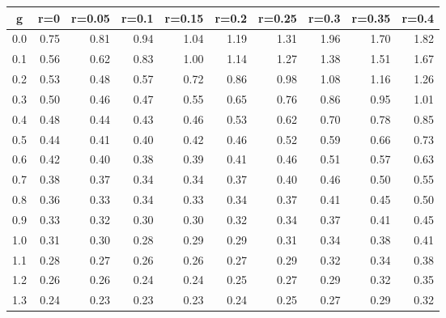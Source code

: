%
\begin{table}[!tbp]
 \begin{center}
 \begin{tabular}{rrrrrrrrrr}\hline\hline
\multicolumn{1}{c}{g}&\multicolumn{1}{c}{r=0}&\multicolumn{1}{c}{r=0.05}&\multicolumn{1}{c}{r=0.1}&\multicolumn{1}{c}{r=0.15}&\multicolumn{1}{c}{r=0.2}&\multicolumn{1}{c}{r=0.25}&\multicolumn{1}{c}{r=0.3}&\multicolumn{1}{c}{r=0.35}&\multicolumn{1}{c}{r=0.4}\tabularnewline
\hline
0.0&0.75&0.81&0.94&1.04&1.19&1.31&1.96&1.70&1.82\tabularnewline
0.1&0.56&0.62&0.83&1.00&1.14&1.27&1.38&1.51&1.67\tabularnewline
0.2&0.53&0.48&0.57&0.72&0.86&0.98&1.08&1.16&1.26\tabularnewline
0.3&0.50&0.46&0.47&0.55&0.65&0.76&0.86&0.95&1.01\tabularnewline
0.4&0.48&0.44&0.43&0.46&0.53&0.62&0.70&0.78&0.85\tabularnewline
0.5&0.44&0.41&0.40&0.42&0.46&0.52&0.59&0.66&0.73\tabularnewline
0.6&0.42&0.40&0.38&0.39&0.41&0.46&0.51&0.57&0.63\tabularnewline
0.7&0.38&0.37&0.34&0.34&0.37&0.40&0.46&0.50&0.55\tabularnewline
0.8&0.36&0.33&0.34&0.33&0.34&0.37&0.41&0.45&0.50\tabularnewline
0.9&0.33&0.32&0.30&0.30&0.32&0.34&0.37&0.41&0.45\tabularnewline
1.0&0.31&0.30&0.28&0.29&0.29&0.31&0.34&0.38&0.41\tabularnewline
1.1&0.28&0.27&0.26&0.26&0.27&0.29&0.32&0.34&0.38\tabularnewline
1.2&0.26&0.26&0.24&0.24&0.25&0.27&0.29&0.32&0.35\tabularnewline
1.3&0.24&0.23&0.23&0.23&0.24&0.25&0.27&0.29&0.32\tabularnewline
\hline
\end{tabular}

\end{center}

\end{table}

